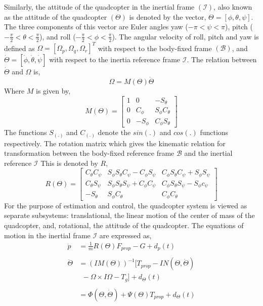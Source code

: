 \documentclass[letterpaper%
, twoside%
, 12pt%
,memoire%
, english%
,creativecommons,hyperref%
]{thETS}
\begin{document}
Similarly, the attitude of the quadcopter in the inertial frame $(\mathcal{I})$, also known as the attitude of the quadcopter $(\Theta)$ is denoted by the vector, $\Theta=[\phi,\theta,\psi]$. The three components of this vector are Euler angles yaw ($-\pi<\psi<\pi$), pitch ($-\frac{\pi}{2}<\theta<\frac{\pi}{2}$), and roll ($-\frac{\pi}{2}<\phi<\frac{\pi}{2}$). The angular velocity of roll, pitch and yaw is defined as $\Omega=[\Omega_p,\Omega_q,\Omega_r]^T$ with respect to the body-fixed frame $(\mathcal{B})$, and $\dot{\Theta}=[\dot{\phi},\dot{\theta},\dot{\psi}]$ with respect to the inertia reference frame $\mathcal{I}$. The relation between $\dot{\Theta}$ and $\Omega$ is, 
\begin{equation}
\Omega=M(\Theta)\dot{\Theta}
\end{equation}
Where $M$ is given by, 
\begin{equation*}
M(\Theta)=
\left[\begin{array}{ccc}
1 & 0 & -S_{\theta} \\
0 & C_{\phi} & S_{\phi}C_{\theta}  \\
0 & -S_{\phi} & C_{\phi}S_{\theta}
\end{array}\right]
\end{equation*}
The functions $S_{(.)}$ and $C_{(.)}$ denote the $sin(.)$ and $cos(.)$ functions respectively. The rotation matrix which gives the kinematic relation for transformation between the body-fixed reference frame $\mathcal{B}$ and the inertial reference $\mathcal{I}$ This is denoted by $R$,
\begin{equation}
R(\Theta)=
\left[\begin{array}{ccc}
C_{\theta}C_{\psi} & S_{\phi}S_{\theta}C_{\psi}-C_{\phi}S_{\psi} & C_{\phi}S_{\theta}C_{\psi}+S_{\phi}S_{\psi} \\
C_{\theta}S_{\psi} & S_{\phi}S_{\theta}S_{\psi}+C_{\phi}C_{\psi} & C_{\phi}S_{\theta}S_{\psi}-S_{\phi}c_{\psi}  \\
-S_{\theta}  & S_{\phi}C_{\theta}  & C_{\phi}C_{\theta}
\end{array}\right]
\end{equation} 
For the purpose of estimation and control, the quadcopter system is viewed as separate subsystems: translational, the linear motion of the center of mass of the quadcopter, and, rotational, the attitude of the quadcopter. The equations of motion in the inertial frame $\mathcal{I}$ are expressed as,
\begin{subequations} \label{eq:dynamic_basic}
\begin{align} 
\ddot{p} &=\frac{1}{m}R(\Theta)F_{prop}-G+d_{p}(t)\nonumber \\ \label{eq:dynamic_basic_translation} \\
\ddot{\Theta} &=(IM(\Theta))^{-1}[T_{prop}-IN(\Theta,\dot{\Theta}) \nonumber \\
& \ \ -\Omega\times I\Omega-T_g]+d_{\Theta}(t)\nonumber\\ \nonumber \\
&=\Phi(\Theta,\dot{\Theta})+\Psi(\Theta) T_{prop}+d_{\Theta}(t)
 \label{eq:dynamic_basic_rotation}
\end{align}
\end{subequations}
\end{document}
